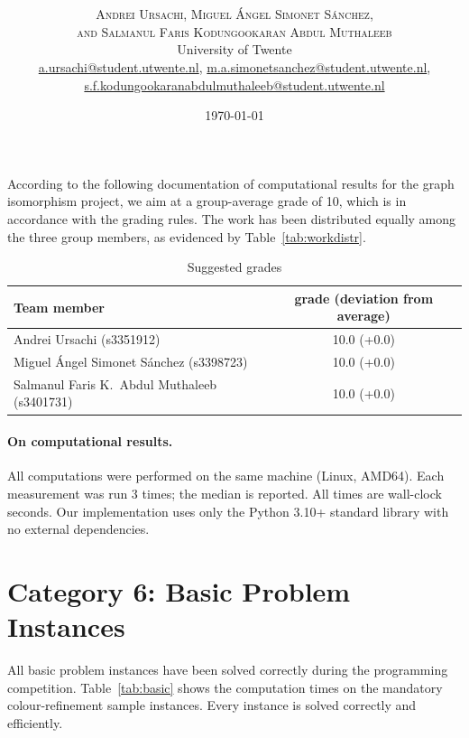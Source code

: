 \documentclass[twoside]{article}
\title{\vspace{-15mm}\fontsize{24pt}{10pt}\selectfont\textbf{\articletitle}} %
\author{
\large
\textsc{Andrei Ursachi, Miguel \'{A}ngel Simonet S\'{a}nchez,}\\
\textsc{and Salmanul Faris Kodungookaran Abdul Muthaleeb}\\[2mm]
\normalsize University of Twente \\
\normalsize \href{mailto:a.ursachi@student.utwente.nl}{a.ursachi@student.utwente.nl},
\href{mailto:m.a.simonetsanchez@student.utwente.nl}{m.a.simonetsanchez@student.utwente.nl},\\
\normalsize \href{mailto:s.f.kodungookaranabdulmuthaleeb@student.utwente.nl}{s.f.kodungookaranabdulmuthaleeb@student.utwente.nl}
}
\date{\today}
\begin{document}
\thispagestyle{empty}
\maketitle %


According to the following documentation of computational results for the graph isomorphism project, we aim at a group-average grade of 10, which is in accordance with the grading rules.
The work has been distributed equally among the three group members, as evidenced by Table~\ref{tab:workdistr}.
\begin{table}[h]
	\centering
	\begin{tabular}{l|c}
		Team member & grade (deviation from average)\\
		\hline
		Andrei Ursachi (s3351912) & 10.0 (+0.0)\\
		Miguel \'{A}ngel Simonet S\'{a}nchez (s3398723) & 10.0 (+0.0)\\
		Salmanul Faris K.\ Abdul Muthaleeb (s3401731) & 10.0 (+0.0)
	\end{tabular}
	\caption{Suggested grades}
\end{table}

\paragraph{On computational results.}
All computations were performed on the same machine (Linux, AMD64). Each measurement was run 3 times; the median is reported. All times are wall-clock seconds. Our implementation uses only the Python 3.10+ standard library with no external dependencies.

\section{Category 6: Basic Problem Instances}

All basic problem instances have been solved correctly during the programming competition. Table~\ref{tab:basic} shows the computation times on the mandatory colour-refinement sample instances. Every instance is solved correctly and efficiently.
\end{document}
